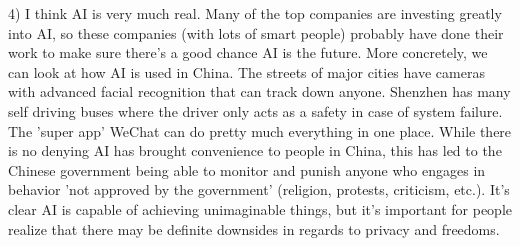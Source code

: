 \documentclass[11pt]{article}
\begin{document}
4) I think AI is very much real. Many of the top companies are investing greatly into AI, so these companies (with lots of smart people) probably have done their work to make sure there's a good chance AI is the future. More concretely, we can look at how AI is used in China. The streets of major cities have cameras with advanced facial recognition that can track down anyone. Shenzhen has many self driving buses where the driver only acts as a safety in case of system failure. The 'super app' WeChat can do pretty much everything in one place. While there is no denying AI has brought convenience to people in China, this has led to the Chinese government being able to monitor and punish anyone who engages in behavior 'not approved by the government' (religion, protests, criticism, etc.).  It's clear AI is capable of achieving unimaginable things, but it's important for people realize that there may be definite downsides in regards to privacy and freedoms.
\end{document}
